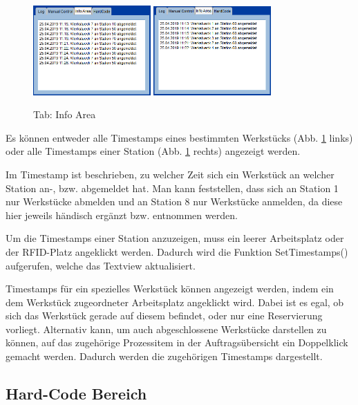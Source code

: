 \begin{figure}[htb]
    \centering
    \includegraphics[width=0.4\textwidth]{Abbildungen/TimestampsWerkstueck.png}
    \includegraphics[width=0.4\textwidth]{Abbildungen/TimestampsStation.png}
    \caption{Tab: Info Area}		
    \label{fig:InfoArea}
\end{figure}

Es können entweder alle Timestamps eines bestimmten Werkstücks (Abb. \ref{fig:InfoArea} links) oder alle Timestamps einer Station (Abb. \ref{fig:InfoArea} rechts) angezeigt werden.

Im Timestamp ist beschrieben, zu welcher Zeit sich ein Werkstück an welcher Station an-, bzw. abgemeldet hat. Man kann feststellen, dass sich an Station 1 nur Werkstücke abmelden und an Station 8 nur Werkstücke anmelden, da diese hier jeweils händisch ergänzt bzw. entnommen werden. 

Um die Timestamps einer Station anzuzeigen, muss ein leerer Arbeitsplatz oder der RFID-Platz angeklickt werden. Dadurch wird die Funktion SetTimestamps() aufgerufen, welche das Textview aktualisiert. 

Timestamps für ein spezielles Werkstück können angezeigt werden, indem ein dem Werkstück zugeordneter Arbeitsplatz angeklickt wird. Dabei ist es egal, ob sich das Werkstück gerade auf diesem befindet, oder nur eine Reservierung vorliegt. Alternativ kann, um auch abgeschlossene Werkstücke darstellen zu können, auf das zugehörige Prozessitem in der Auftragsübersicht ein Doppelklick gemacht werden. Dadurch werden die zugehörigen Timestamps dargestellt. 

\subsection{Hard-Code Bereich}
\label{sec:HardCode}

